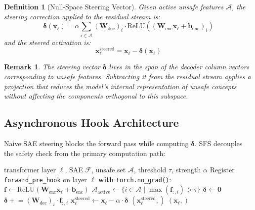 \documentclass[10pt,twocolumn]{article}
\newtheorem{definition}{Definition}
\newtheorem{remark}{Remark}
\begin{document}
\begin{definition}[Null-Space Steering Vector]
Given active unsafe features $\mathcal{A}$, the steering correction applied to the residual stream is:
\begin{equation}
\boldsymbol{\delta}(\mathbf{x}_\ell) = \alpha \sum_{i \in \mathcal{A}} (\mathbf{W}_{\text{dec}})_i \cdot \text{ReLU}\left((\mathbf{W}_{\text{enc}} \mathbf{x}_\ell + \mathbf{b}_{\text{enc}})_i\right)
\end{equation}
and the steered activation is:
\begin{equation}
\mathbf{x}_\ell^{\text{steered}} = \mathbf{x}_\ell - \boldsymbol{\delta}(\mathbf{x}_\ell)
\end{equation}
\end{definition}

\begin{remark}
The steering vector $\boldsymbol{\delta}$ lives in the span of the decoder column vectors corresponding to unsafe features. Subtracting it from the residual stream applies a projection that reduces the model's internal representation of unsafe concepts without affecting the components orthogonal to this subspace.
\end{remark}

\subsection{Asynchronous Hook Architecture}

Naive SAE steering blocks the forward pass while computing $\boldsymbol{\delta}$. SFS decouples the safety check from the primary computation path:

\begin{algorithm}
\caption{Speculative Feature Steering — Async Hook}
\begin{algorithmic}[1]
\Require transformer layer $\ell$, SAE $\mathcal{F}$, unsafe set $\mathcal{A}$, threshold $\tau$, strength $\alpha$
\State Register \texttt{forward\_pre\_hook} on layer $\ell$
    \State \textbf{with} \texttt{torch.no\_grad()}:
    \State \quad $\mathbf{f} \leftarrow \text{ReLU}(\mathbf{W}_{\text{enc}} \mathbf{x}_\ell + \mathbf{b}_{\text{enc}})$
    \State \quad $\mathcal{A}_{\text{active}} \leftarrow \{i \in \mathcal{A} \mid \max(\mathbf{f}_{:,i}) > \tau\}$
        \State $\boldsymbol{\delta} \leftarrow \mathbf{0}$
            \State $\boldsymbol{\delta} \mathrel{+}= (\mathbf{W}_{\text{dec}})_i \cdot \mathbf{f}_{:,i}$
        \EndFor
        \State $\mathbf{x}_\ell^{\text{steered}} \leftarrow \mathbf{x}_\ell - \alpha \cdot \boldsymbol{\delta}$
        \State \Return $(\mathbf{x}_\ell^{\text{steered}},)$
    \EndIf
    \State \Return $(\mathbf{x}_\ell,)$
\EndFunction
\end{algorithmic}
\end{algorithm}
\end{document}

